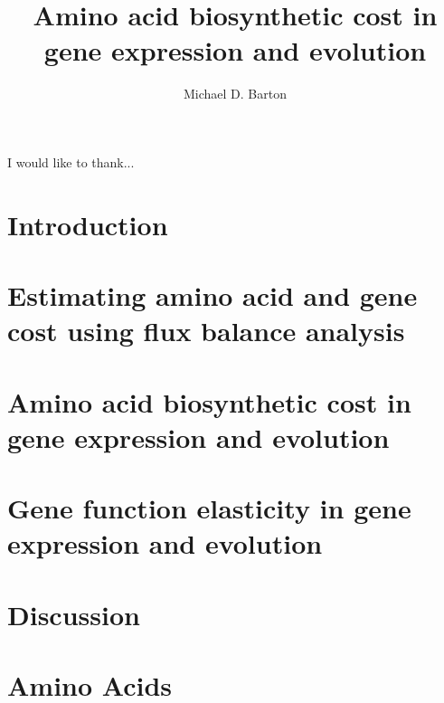 \documentclass[12pt,PhD]{muthesis}
\begin{document}
\title{Amino acid biosynthetic cost in gene expression and evolution}
\author{Michael D. Barton}

\beforeabstract

\printnomenclature[1.5cm]


\afterabstract

I would like to thank...
\afterpreface

\chapter{Introduction}

\chapter{Estimating amino acid and gene cost using flux balance analysis}

\chapter{Amino acid biosynthetic cost in gene expression and evolution}

\chapter{Gene function elasticity in gene expression and evolution}

\chapter{Discussion}





\appendix
\addappheadtotoc
\appendixpage
\chapter{Amino Acids}

\end{document}
